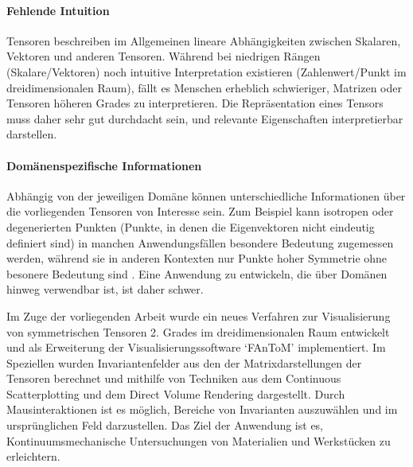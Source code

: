 \documentclass[a4paper,fontsize=12pt,toc=bib,halfparskip]{scrartcl}
\begin{document}
\paragraph{Fehlende Intuition}
Tensoren beschreiben im Allgemeinen lineare Abh\"angigkeiten zwischen Skalaren, Vektoren und anderen Tensoren. W\"ahrend bei niedrigen R\"angen (Skalare/Vektoren) noch intuitive Interpretation existieren (Zahlenwert/Punkt im dreidimensionalen Raum), f\"allt es Menschen erheblich schwieriger, Matrizen oder Tensoren h\"oheren Grades zu interpretieren. Die Repr\"asentation eines Tensors muss daher sehr gut durchdacht sein, und relevante Eigenschaften interpretierbar darstellen.

\paragraph{Dom\"anenspezifische Informationen}
Abh\"angig von der jeweiligen Dom\"ane k\"onnen unterschiedliche Informationen \"uber die vorliegenden Tensoren von Interesse sein.  Zum Beispiel kann isotropen oder degenerierten Punkten (Punkte, in denen die Eigenvektoren nicht eindeutig definiert sind) in manchen Anwendungsf\"allen besondere Bedeutung zugemessen werden, w\"ahrend sie in anderen Kontexten nur Punkte hoher Symmetrie ohne besonere Bedeutung sind \cite[S.~4]{hlawitschka2014top}. Eine Anwendung zu entwickeln, die \"uber Dom\"anen hinweg verwendbar ist, ist daher schwer.


Im Zuge der vorliegenden Arbeit wurde ein neues Verfahren zur Visualisierung von symmetrischen Tensoren 2. Grades im dreidimensionalen Raum entwickelt und als Erweiterung der Visualisierungssoftware `FAnToM' implementiert. Im Speziellen wurden Invariantenfelder aus den der Matrixdarstellungen der Tensoren berechnet und mithilfe von Techniken aus dem Continuous Scatterplotting und dem Direct Volume Rendering dargestellt. Durch Mausinteraktionen ist es m\"oglich, Bereiche von Invarianten auszuw\"ahlen und im urspr\"unglichen Feld darzustellen. Das Ziel der Anwendung ist es, Kontinuumsmechanische Untersuchungen von Materialien und Werkst\"ucken zu erleichtern.
\end{document}
